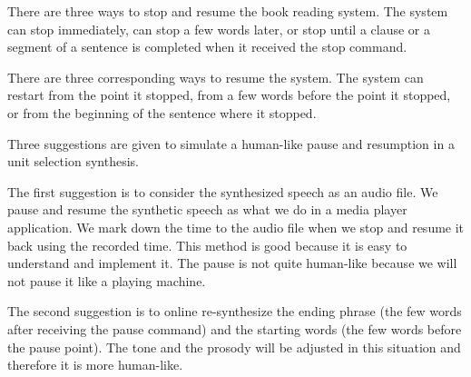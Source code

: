 \documentclass[12pt]{article}
\newenvironment{problem}[2][Problem]{\begin{trivlist}
\item[\hskip \labelsep {\bfseries #1}\hskip \labelsep {\bfseries #2.}]}{\end{trivlist}}
\begin{document}
\begin{problem}{2.3}

    There are three ways to stop and resume the book reading system. 
    The system can stop immediately, can stop a few words later, or stop until 
    a clause or a segment of a sentence is completed when it received the stop command. 
    
    There are three corresponding ways to resume the system. 
    The system can restart from the point it stopped, from a few words before 
    the point it stopped, or from the beginning of the sentence where it stopped. 
    
    Three suggestions are given to simulate a human-like pause and resumption in
    a unit selection synthesis.

    The first suggestion is to consider the synthesized speech as an audio file.
    We pause and resume the synthetic speech as what we do in a media player
    application. We mark down the time to the audio file when we stop and resume
    it back using the recorded time.
    This method is good because it is easy to understand and implement it. 
    The pause is not quite human-like because we will not pause it like a playing machine. 
    
    
    The second suggestion is to online re-synthesize the ending phrase 
    (the few words after receiving the pause command) and the starting words 
    (the few words before the pause point). 
    The tone and the prosody will be adjusted in this situation and therefore 
    it is more human-like. 
    

\end{problem}
\end{document}
